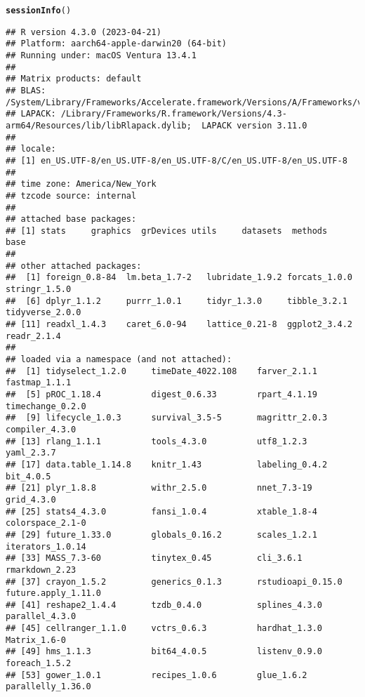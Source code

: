 \documentclass{article}\usepackage[]{graphicx}\usepackage[]{xcolor}
\makeatletter
\newcommand{\hlstd}[1]{\textcolor[rgb]{0.345,0.345,0.345}{#1}}%
\newcommand{\hlkwd}[1]{\textcolor[rgb]{0.737,0.353,0.396}{\textbf{#1}}}%
\newenvironment{kframe}{%
 \def\at@end@of@kframe{}%
 \ifinner\ifhmode%
  \def\at@end@of@kframe{\end{minipage}}%
  \begin{minipage}{\columnwidth}%
 \fi\fi%
 \def\FrameCommand##1{\hskip\@totalleftmargin \hskip-\fboxsep
 \colorbox{shadecolor}{##1}\hskip-\fboxsep
     \hskip-\linewidth \hskip-\@totalleftmargin \hskip\columnwidth}%
 \MakeFramed {\advance\hsize-\width
   \@totalleftmargin\z@ \linewidth\hsize
   \@setminipage}}%
 {\par\unskip\endMakeFramed%
 \at@end@of@kframe}
\newenvironment{knitrout}{}{} %
\makeatother
\begin{document}
\begin{knitrout}
\color{fgcolor}\begin{kframe}
\begin{alltt}
\hlkwd{sessionInfo}\hlstd{()}
\end{alltt}
\begin{verbatim}
## R version 4.3.0 (2023-04-21)
## Platform: aarch64-apple-darwin20 (64-bit)
## Running under: macOS Ventura 13.4.1
## 
## Matrix products: default
## BLAS:   /System/Library/Frameworks/Accelerate.framework/Versions/A/Frameworks/vecLib.framework/Versions/A/libBLAS.dylib 
## LAPACK: /Library/Frameworks/R.framework/Versions/4.3-arm64/Resources/lib/libRlapack.dylib;  LAPACK version 3.11.0
## 
## locale:
## [1] en_US.UTF-8/en_US.UTF-8/en_US.UTF-8/C/en_US.UTF-8/en_US.UTF-8
## 
## time zone: America/New_York
## tzcode source: internal
## 
## attached base packages:
## [1] stats     graphics  grDevices utils     datasets  methods   base     
## 
## other attached packages:
##  [1] foreign_0.8-84  lm.beta_1.7-2   lubridate_1.9.2 forcats_1.0.0   stringr_1.5.0  
##  [6] dplyr_1.1.2     purrr_1.0.1     tidyr_1.3.0     tibble_3.2.1    tidyverse_2.0.0
## [11] readxl_1.4.3    caret_6.0-94    lattice_0.21-8  ggplot2_3.4.2   readr_2.1.4    
## 
## loaded via a namespace (and not attached):
##  [1] tidyselect_1.2.0     timeDate_4022.108    farver_2.1.1         fastmap_1.1.1       
##  [5] pROC_1.18.4          digest_0.6.33        rpart_4.1.19         timechange_0.2.0    
##  [9] lifecycle_1.0.3      survival_3.5-5       magrittr_2.0.3       compiler_4.3.0      
## [13] rlang_1.1.1          tools_4.3.0          utf8_1.2.3           yaml_2.3.7          
## [17] data.table_1.14.8    knitr_1.43           labeling_0.4.2       bit_4.0.5           
## [21] plyr_1.8.8           withr_2.5.0          nnet_7.3-19          grid_4.3.0          
## [25] stats4_4.3.0         fansi_1.0.4          xtable_1.8-4         colorspace_2.1-0    
## [29] future_1.33.0        globals_0.16.2       scales_1.2.1         iterators_1.0.14    
## [33] MASS_7.3-60          tinytex_0.45         cli_3.6.1            rmarkdown_2.23      
## [37] crayon_1.5.2         generics_0.1.3       rstudioapi_0.15.0    future.apply_1.11.0 
## [41] reshape2_1.4.4       tzdb_0.4.0           splines_4.3.0        parallel_4.3.0      
## [45] cellranger_1.1.0     vctrs_0.6.3          hardhat_1.3.0        Matrix_1.6-0        
## [49] hms_1.1.3            bit64_4.0.5          listenv_0.9.0        foreach_1.5.2       
## [53] gower_1.0.1          recipes_1.0.6        glue_1.6.2           parallelly_1.36.0   

\end{verbatim}
\end{kframe}
\end{knitrout}
\end{document}
